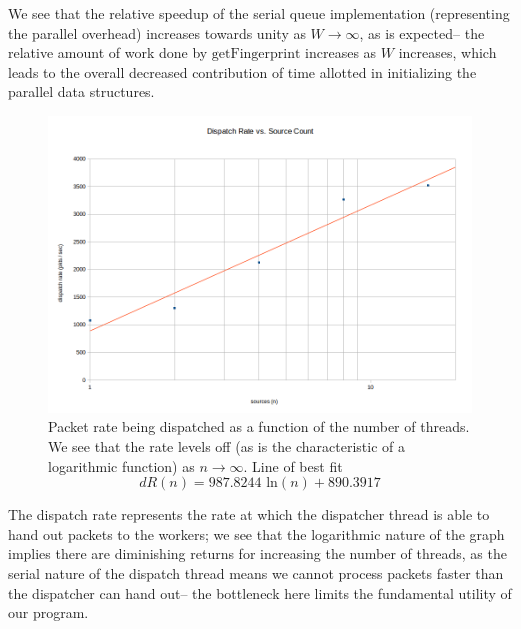 \documentclass{article}
\newcommand{\cpart}[1]{\newblock{\LARGE {\\\\#1}}}
\newcommand{\code}[1]{\texttt{$\text{#1}$}}
\begin{document}
We see that the relative speedup of the serial queue implementation (representing the parallel overhead) increases towards unity as $W \to \infty$, as is expected-- 
the relative amount of work done by \code{getFingerprint} increases as $W$ increases, which leads to the overall decreased contribution of time allotted in 
initializing the parallel data structures.

\cpart{Dispatcher Rate}

\begin{figure}
\begin{center}
	\includegraphics[scale=0.5]{dispatcher_rate.png}
	\caption{Packet rate being dispatched as a function of the number of threads. We see that the rate levels off (as is the characteristic of a logarithmic function) as $n \to \infty$. Line of best fit $$dR(n) = 987.8244\text{ ln}(n) + 890.3917$$}
	\label{dispatcher_rate}
\end{center}
\end{figure}

The dispatch rate represents the rate at which the dispatcher thread is able to hand out packets to the workers; we see that the logarithmic nature of the graph 
implies there are diminishing returns for increasing the number of threads, as the serial nature of the dispatch thread means we cannot process packets faster than 
the dispatcher can hand out-- the bottleneck here limits the fundamental utility of our program.

\cpart{Speedup with Uniform Load}
\end{document}
